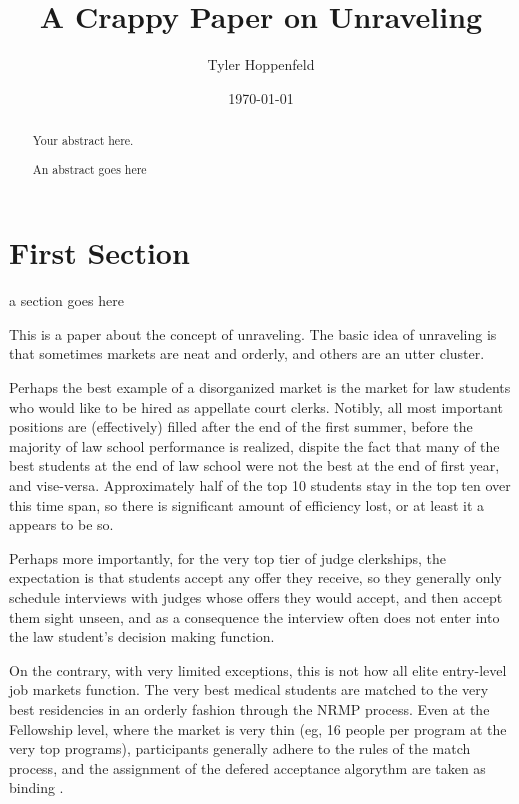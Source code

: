\documentclass[AER]{AEA}
\begin{document}
\title{A Crappy Paper on Unraveling}
\author{Tyler Hoppenfeld}
\date{\today}
\JEL{}
\Keywords{}

\begin{abstract}
Your abstract here.
\end{abstract}


\maketitle

\begin{abstract}
	An abstract goes here
\end{abstract}

\section{First Section}
a section goes here

This is a paper about the concept of unraveling.  The basic idea of unraveling is that sometimes markets are neat and orderly, and others are an utter cluster.  

Perhaps the best example of a disorganized market is the market for law students who would like to be hired as appellate court clerks.  Notibly, all most important positions are (effectively) filled after the end of the first summer, before the majority of law school performance is realized, dispite the fact that many of the best students at the end of law school were not the best at the end of first year, and vise-versa. Approximately half of the top 10 students stay in the top ten over this time span, so there is significant amount of efficiency lost, or at least it a appears to be so.

Perhaps more importantly, for the very top tier of judge clerkships, the expectation is that students accept any offer they receive, so they generally only schedule interviews with judges whose offers they would accept, and then accept them sight unseen, and as a consequence the interview often does not enter into the law student's decision making function. \cite{Avery2001}

On the contrary, with very limited exceptions, this is not how all elite entry-level job markets function.  The very best medical students are matched to the very best residencies in an orderly fashion through the NRMP process.  Even at the Fellowship level, where the market is very thin (eg, 16 people per program at the very top programs), participants generally adhere to the rules of the match process, and the assignment of the defered acceptance algorythm are taken as binding \cite{Niederle2008,Niederle2003,Niederle2005}.
\end{document}

